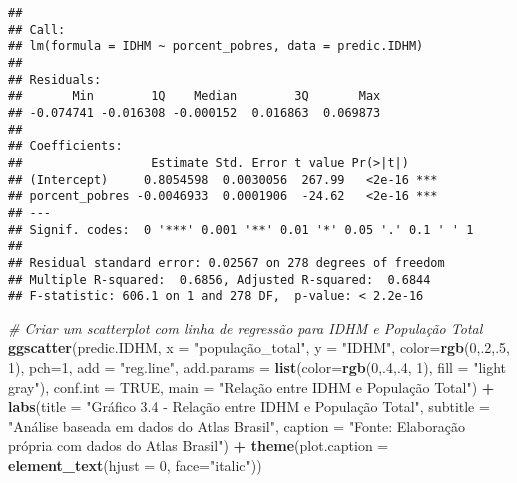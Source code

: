 \documentclass[
]{article}
\newenvironment{Shaded}{\begin{snugshade}}{\end{snugshade}}
\newcommand{\AttributeTok}[1]{\textcolor[rgb]{0.13,0.29,0.53}{#1}}
\newcommand{\CommentTok}[1]{\textcolor[rgb]{0.56,0.35,0.01}{\textit{#1}}}
\newcommand{\ConstantTok}[1]{\textcolor[rgb]{0.56,0.35,0.01}{#1}}
\newcommand{\DecValTok}[1]{\textcolor[rgb]{0.00,0.00,0.81}{#1}}
\newcommand{\FunctionTok}[1]{\textcolor[rgb]{0.13,0.29,0.53}{\textbf{#1}}}
\newcommand{\NormalTok}[1]{#1}
\newcommand{\SpecialCharTok}[1]{\textcolor[rgb]{0.81,0.36,0.00}{\textbf{#1}}}
\newcommand{\StringTok}[1]{\textcolor[rgb]{0.31,0.60,0.02}{#1}}
\begin{document}
\begin{verbatim}
## 
## Call:
## lm(formula = IDHM ~ porcent_pobres, data = predic.IDHM)
## 
## Residuals:
##       Min        1Q    Median        3Q       Max 
## -0.074741 -0.016308 -0.000152  0.016863  0.069873 
## 
## Coefficients:
##                  Estimate Std. Error t value Pr(>|t|)    
## (Intercept)     0.8054598  0.0030056  267.99   <2e-16 ***
## porcent_pobres -0.0046933  0.0001906  -24.62   <2e-16 ***
## ---
## Signif. codes:  0 '***' 0.001 '**' 0.01 '*' 0.05 '.' 0.1 ' ' 1
## 
## Residual standard error: 0.02567 on 278 degrees of freedom
## Multiple R-squared:  0.6856, Adjusted R-squared:  0.6844 
## F-statistic: 606.1 on 1 and 278 DF,  p-value: < 2.2e-16
\end{verbatim}

\begin{Shaded}
\begin{Highlighting}[]
\CommentTok{\# Criar um scatterplot com linha de regressão para IDHM e População Total}
\FunctionTok{ggscatter}\NormalTok{(predic.IDHM, }\AttributeTok{x =} \StringTok{"população\_total"}\NormalTok{, }\AttributeTok{y =} \StringTok{"IDHM"}\NormalTok{, }
          \AttributeTok{color=}\FunctionTok{rgb}\NormalTok{(}\DecValTok{0}\NormalTok{,.}\DecValTok{2}\NormalTok{,.}\DecValTok{5}\NormalTok{,  }\DecValTok{1}\NormalTok{), }\AttributeTok{pch=}\DecValTok{1}\NormalTok{, }\AttributeTok{add =} \StringTok{"reg.line"}\NormalTok{, }
          \AttributeTok{add.params =} \FunctionTok{list}\NormalTok{(}\AttributeTok{color=}\FunctionTok{rgb}\NormalTok{(}\DecValTok{0}\NormalTok{,.}\DecValTok{4}\NormalTok{,.}\DecValTok{4}\NormalTok{,  }\DecValTok{1}\NormalTok{), }\AttributeTok{fill =} \StringTok{"light gray"}\NormalTok{), }
          \AttributeTok{conf.int =} \ConstantTok{TRUE}\NormalTok{, }\AttributeTok{main =} \StringTok{"Relação entre IDHM e População Total"}\NormalTok{) }\SpecialCharTok{+}
  \FunctionTok{labs}\NormalTok{(}\AttributeTok{title =} \StringTok{"Gráfico 3.4 {-} Relação entre IDHM e População Total"}\NormalTok{,}
       \AttributeTok{subtitle =} \StringTok{"Análise baseada em dados do Atlas Brasil"}\NormalTok{,}
       \AttributeTok{caption =} \StringTok{"Fonte: Elaboração própria com dados do Atlas Brasil"}\NormalTok{) }\SpecialCharTok{+}
  \FunctionTok{theme}\NormalTok{(}\AttributeTok{plot.caption =} \FunctionTok{element\_text}\NormalTok{(}\AttributeTok{hjust =} \DecValTok{0}\NormalTok{, }\AttributeTok{face=}\StringTok{"italic"}\NormalTok{))}
\end{Highlighting}
\end{Shaded}
\end{document}
